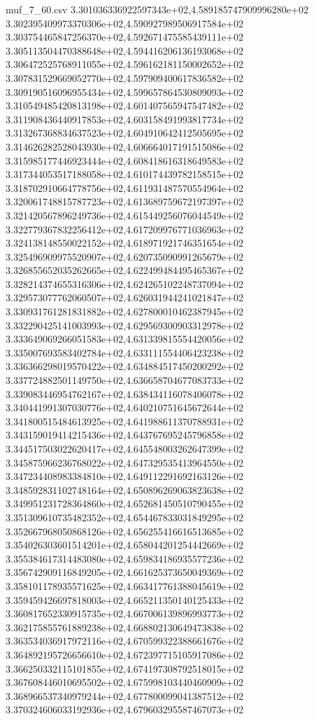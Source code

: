 \begin{filecontents*}{muf_7_60.csv}
3.301036336922597343e+02,4.589185747909996280e+02
3.302395409973370306e+02,4.590927989506917584e+02
3.303754465847256370e+02,4.592671475585439111e+02
3.305113504470388648e+02,4.594416206136193068e+02
3.306472525768911055e+02,4.596162181150002652e+02
3.307831529669052770e+02,4.597909400617836582e+02
3.309190516096955434e+02,4.599657864530809093e+02
3.310549485420813198e+02,4.601407565947547482e+02
3.311908436440917853e+02,4.603158491993817734e+02
3.313267368834637523e+02,4.604910642412505695e+02
3.314626282528043930e+02,4.606664017191515086e+02
3.315985177446923444e+02,4.608418616318649583e+02
3.317344053517188058e+02,4.610174439782158515e+02
3.318702910664778756e+02,4.611931487570554964e+02
3.320061748815787723e+02,4.613689759672197397e+02
3.321420567896249736e+02,4.615449256076044549e+02
3.322779367832256412e+02,4.617209976771036963e+02
3.324138148550022152e+02,4.618971921746351654e+02
3.325496909975520907e+02,4.620735090991265679e+02
3.326855652035262665e+02,4.622499484495465367e+02
3.328214374655316306e+02,4.624265102248737094e+02
3.329573077762060507e+02,4.626031944241021847e+02
3.330931761281831882e+02,4.627800010462387945e+02
3.332290425141003993e+02,4.629569300903312978e+02
3.333649069266051583e+02,4.631339815554420056e+02
3.335007693583402784e+02,4.633111554406423238e+02
3.336366298019570422e+02,4.634884517450200292e+02
3.337724882501149750e+02,4.636658704677083733e+02
3.339083446954762167e+02,4.638434116078406078e+02
3.340441991307030776e+02,4.640210751645672644e+02
3.341800515484613925e+02,4.641988611370788931e+02
3.343159019414215436e+02,4.643767695245796858e+02
3.344517503022620417e+02,4.645548003262647399e+02
3.345875966236768022e+02,4.647329535413964550e+02
3.347234408983384810e+02,4.649112291692163126e+02
3.348592831102748164e+02,4.650896269063823638e+02
3.349951231728364860e+02,4.652681450510790455e+02
3.351309610735482352e+02,4.654467833031849295e+02
3.352667968050868126e+02,4.656255416616513685e+02
3.354026303601514201e+02,4.658044201254442669e+02
3.355384617314483080e+02,4.659834186935577236e+02
3.356742909116849205e+02,4.661625373650049369e+02
3.358101178935571625e+02,4.663417761388045619e+02
3.359459426697818003e+02,4.665211350140125433e+02
3.360817652330915735e+02,4.667006139896993773e+02
3.362175855761889238e+02,4.668802130649473838e+02
3.363534036917972116e+02,4.670599322388661676e+02
3.364892195726656610e+02,4.672397715105917086e+02
3.366250332115101855e+02,4.674197308792518015e+02
3.367608446010695502e+02,4.675998103440460909e+02
3.368966537340979244e+02,4.677800099041387512e+02
3.370324606033192936e+02,4.679603295587467073e+02

\end{filecontents*}
